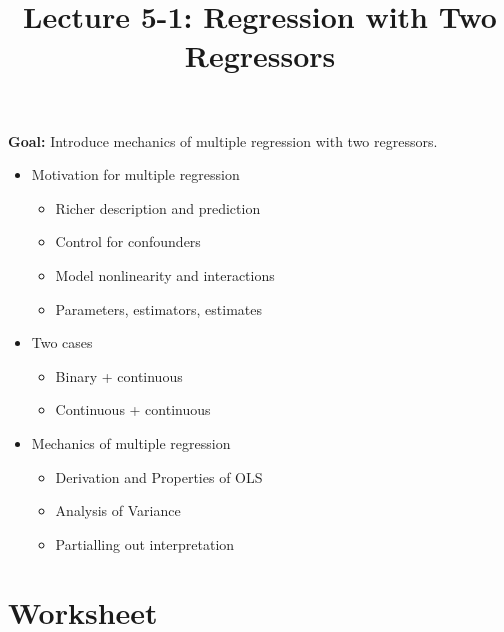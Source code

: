 \documentclass[12pt]{article}
\title{\Large Lecture 5-1: Regression with Two Regressors}
\author{}
\date{}
\begin{document}
\maketitle
\vspace{-6em}

\noindent \textbf{Goal:} Introduce mechanics of multiple regression with two regressors.\medskip

\begin{itemize}\setlength{\itemsep}{1em}
\item Motivation for multiple regression
\begin{itemize}
\item Richer description and prediction
\item Control for confounders
\item Model nonlinearity and interactions
\item Parameters, estimators, estimates
\end{itemize}
\item Two cases
\begin{itemize}
\item Binary + continuous
\item Continuous + continuous
\end{itemize}
\item Mechanics of multiple regression
\begin{itemize}
\item Derivation and Properties of OLS
\item Analysis of Variance
\item Partialling out interpretation
\end{itemize}
\end{itemize}


\clearpage


\section*{Worksheet}
\end{document}
